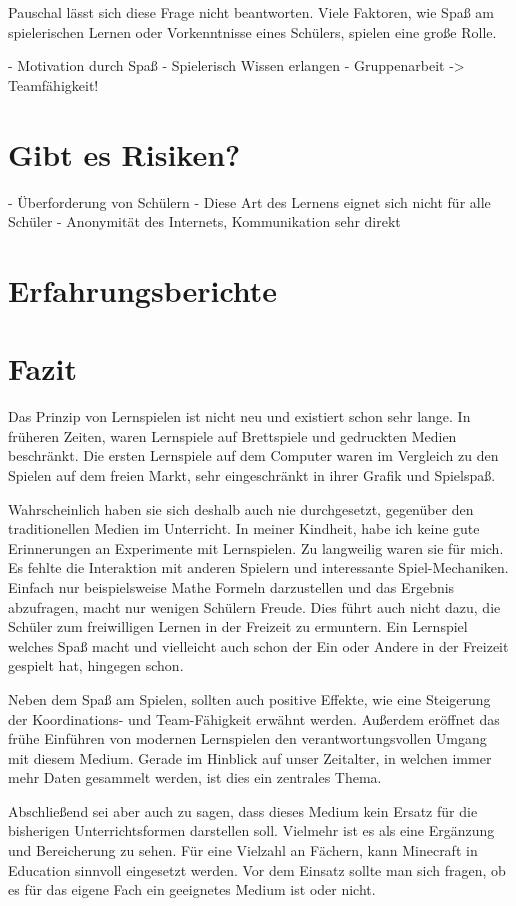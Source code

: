 Pauschal lässt sich diese Frage nicht beantworten. Viele Faktoren, wie Spaß am spielerischen Lernen oder Vorkenntnisse eines Schülers, spielen eine große Rolle. 

- Motivation durch Spaß
- Spielerisch Wissen erlangen
- Gruppenarbeit -> Teamfähigkeit!

\section{Gibt es Risiken?}

- Überforderung von Schülern
- Diese Art des Lernens eignet sich nicht für alle Schüler
- Anonymität des Internets, Kommunikation sehr direkt

\section{Erfahrungsberichte}

\section{Fazit}
Das Prinzip von Lernspielen ist nicht neu und existiert schon sehr lange. In früheren Zeiten, waren Lernspiele auf Brettspiele und gedruckten Medien beschränkt. Die ersten Lernspiele auf dem Computer waren im Vergleich zu den Spielen auf dem freien Markt, sehr eingeschränkt in ihrer Grafik und Spielspaß. 

Wahrscheinlich haben sie sich deshalb auch nie durchgesetzt, gegenüber den traditionellen Medien im Unterricht.
In meiner Kindheit, habe ich keine gute Erinnerungen an Experimente mit Lernspielen. Zu langweilig waren sie für mich. Es fehlte die Interaktion mit anderen Spielern und interessante Spiel-Mechaniken. Einfach nur beispielsweise Mathe Formeln darzustellen und das Ergebnis abzufragen, macht nur wenigen Schülern Freude. Dies führt auch nicht dazu, die Schüler zum freiwilligen Lernen in der Freizeit zu ermuntern. Ein Lernspiel welches Spaß macht und vielleicht auch schon der Ein oder Andere in der Freizeit gespielt hat, hingegen schon.

Neben dem Spaß am Spielen, sollten auch positive Effekte, wie eine Steigerung der Koordinations- und Team-Fähigkeit erwähnt werden. Außerdem eröffnet das frühe Einführen von modernen Lernspielen den verantwortungsvollen Umgang mit diesem Medium. Gerade im Hinblick auf unser Zeitalter, in welchen immer mehr Daten gesammelt werden, ist dies ein zentrales Thema.

Abschließend sei aber auch zu sagen, dass dieses Medium kein Ersatz für die bisherigen Unterrichtsformen darstellen soll. Vielmehr ist es als eine Ergänzung und Bereicherung zu sehen. Für eine Vielzahl an Fächern, kann Minecraft in Education sinnvoll eingesetzt werden. Vor dem Einsatz sollte man sich fragen, ob es für das eigene Fach ein geeignetes Medium ist oder nicht.